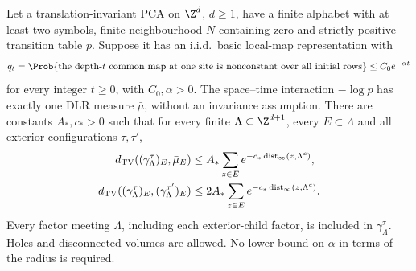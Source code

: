 \begin{proposition}\label{prop:lower-transfer}
Let a translation-invariant PCA on $\Z^d$, $d\ge1$, have a finite alphabet with at least two symbols, finite neighbourhood $N$ containing zero and strictly positive transition table $p$. Suppose it has an i.i.d.\ basic local-map representation with
\[
 q_t=\Prob\{\text{the depth-$t$ common map at one site is nonconstant
 over all initial rows}\}\le C_0e^{-\alpha t}
\]
for every integer $t\ge0$, with $C_0,\alpha>0$. The space--time interaction $-\log p$ has exactly one DLR measure $\bar\mu$, without an invariance assumption. There are constants $A_*,c_*>0$ such that for every finite $\Lambda\subset\Z^{d+1}$, every $E\subset\Lambda$ and all exterior configurations $\tau,\tau'$,
\[
 \begin{aligned}
 d_{\rm TV}((\gamma_\Lambda^\tau)_E,\bar\mu_E)
 &\le A_*\sum_{z\in E}e^{-c_*\operatorname{dist}_\infty(z,\Lambda^c)},\\
 d_{\rm TV}((\gamma_\Lambda^\tau)_E,(\gamma_\Lambda^{\tau'})_E)
 &\le 2A_*\sum_{z\in E}e^{-c_*\operatorname{dist}_\infty(z,\Lambda^c)}.
 \end{aligned}
\]
Every factor meeting $\Lambda$, including each exterior-child factor, is included in $\gamma_\Lambda^\tau$. Holes and disconnected volumes are allowed. No lower bound on $\alpha$ in terms of the radius is required.
\end{proposition}
